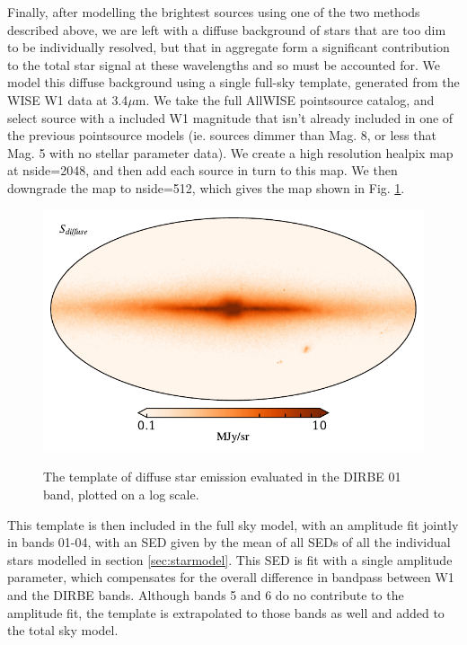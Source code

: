 \documentclass{aa}
\begin{document}
Finally, after modelling the brightest sources using one of the two methods described above, we are left with a diffuse background of stars that are too dim to be individually resolved, but that in aggregate form a significant contribution to the total star signal at these wavelengths and so must be accounted for. We model this diffuse background using a single full-sky template, generated from the WISE W1 data at 3.4$\mu$m. We take the full AllWISE pointsource catalog, and select source with a included W1 magnitude that isn't already included in one of the previous pointsource models (ie. sources dimmer than Mag. 8, or less that Mag. 5 with no stellar parameter data). We create a high resolution healpix map \citep{healpix} at nside=2048, and then add each source in turn to this map. We then downgrade the map to nside=512, which gives the map shown in Fig. \ref{fig:diffuse}. 

\begin{figure}
  \centering
  \includegraphics[width=\columnwidth]{figs/diffuseTemplate/diffuse_stars_log.pdf}\\
  \caption{The template of diffuse star emission evaluated in the DIRBE 01 band, plotted on a log scale.}
  \label{fig:diffuse}
\end{figure}

This template is then included in the full sky model, with an amplitude fit jointly in bands 01-04, with an SED given by the mean of all SEDs of all the individual stars modelled in section \ref{sec:starmodel}. This SED is fit with a single amplitude parameter, which compensates for the overall difference in bandpass between W1 and the DIRBE bands. Although bands 5 and 6 do no contribute to the amplitude fit, the template is extrapolated to those bands as well and added to the total sky model.
\end{document}
